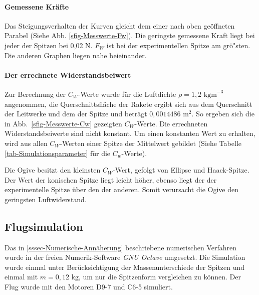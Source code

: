 \documentclass[10pt,a4paper]{article}
\begin{document}
\paragraph{Gemessene Kräfte}
Das Steigungsverhalten der Kurven gleicht dem einer nach oben geöffneten Parabel (Siehe Abb. \ref{sfig-Messwerte-Fw}). Die geringste gemessene Kraft liegt bei jeder der Spitzen bei 0,02 N. $F_{W}$ ist bei der experimentellen Spitze am grö"sten. Die anderen Graphen liegen nahe beieinander.

\paragraph{Der errechnete Widerstandsbeiwert}
Zur Berechnung der $C_{W}$-Werte wurde für die Luftdichte ${\rho} = 1,2 \text{ kgm}^{-3}$ angenommen, die Querschnittsfläche der Rakete ergibt sich aus dem Querschnitt der Leitwerke und dem der Spitze und beträgt $ 0,0014486 \text{ m}^{2} $. So ergeben sich die in Abb.~\ref{sfig-Messwerte-Cw} gezeigten $C_{W}$-Werte.
Die errechneten Widerstandsbeiwerte sind nicht konstant. Um einen konstanten Wert zu erhalten, wird aus allen $C_{W}$-Werten einer Spitze der Mittelwert gebildet (Siehe Tabelle \ref{tab-Simulationsparameter} für die $C_{w}$-Werte).

Die Ogive besitzt den kleinsten $C_{W}$-Wert, gefolgt von Ellipse und Haack-Spitze. Der Wert der konischen Spitze liegt leicht höher, ebenso liegt der der experimentelle Spitze über den der anderen. Somit verursacht die Ogive den geringsten Luftwiderstand. 


\subsection{Flugsimulation}

Das in \ref{sssec-Numerische-Annäherung} beschriebene numerischen Verfahren wurde in der freien Numerik-Software \emph{GNU Octave} umgesetzt. Die Simulation wurde einmal unter Berücksichtigung der Massenunterschiede der Spitzen und einmal mit $m = 0,12 \text{ kg}$, um nur die Spitzenform vergleichen zu können. Der Flug wurde mit den Motoren \textsf{D9-7} und \textsf{C6-5} simuliert.
\end{document}

